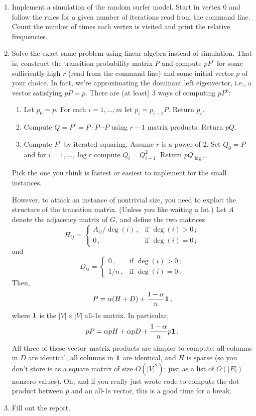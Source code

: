 \documentclass{tufte-handout}
\begin{document}
\begin{enumerate}
\item Implement a simulation of the random surfer model. 
  Start in
  vertex 0 and follow the rules for a given number of iterations read
  from the command line. Count the number of times each vertex is
  visited and print the relative frequencies.
\item Solve the exact same problem using linear algebra instead of
  simulation.
  That is, construct the transition probability matrix $P$ and
  compute $pP^r$ for some sufficiently high $r$ (read from the command
  line) and some initial vector $p$ of your choice.
  In fact, we're approximating the dominant left eigenvector, i.e., a
  vector satisfying $pP= p$.
  There are (at least) 3 ways of computing $pP^r$:
  \begin{enumerate} 
  \item Let $p_0= p$. For each $i=1,\ldots, m$ let $p_i = p_{i-1}
    P$. Return $p_r$.
  \item Compute $Q = P^r = P\cdot P \cdots P$ using $r-1$ matrix products.
    Return $pQ$.
  \item Compute $P^r$ by iterated squaring. Assume $r$ is a power of
    2. Set $Q_0 = P$ and for $i=1,\ldots,\log r$ compute $Q_i =
    Q_{i-1}^2$. Return $pQ_{\log r}$. 
  \end{enumerate}
  Pick the one you think is fastest or easiest to implement for the
  small instances.

  However, to attack an instance of nontrivial size, you need to
  exploit the structure of the transition matrix.
  (Unless you like waiting a lot.)
  Let $A$ denote the adjacency matrix of $G$, and define the two
  matrices
  \[
  H_{ij} =
  \begin{cases}
    A_{ij} / \deg(i)\,, & \text{if } \deg(i) > 0\,; \\
    0\,, & \text{if } \deg(i) = 0 \,;   
  \end{cases}
  \]
  and
  \[
  D_{ij} =
  \begin{cases}
    0\,, & \text{if } \deg(i) > 0\,; \\
    1 / n\,, & \text{if } \deg(i) = 0\,.
  \end{cases}
  \]
  Then,
  \[ P = \alpha(H + D) + \frac{1-\alpha}{n} \bf 1\,,\]
  where $\bf 1$ is the $|V|\times |V|$ all-1s matrix.
  In particular,
  \[pP = \alpha p H + \alpha p D + \frac{1-\alpha}{n} p \bf 1\,.\] All
  three of these vector--matrix products are simpler to compute: all
  columns in $D$ are identical, all columns in $\bf 1$ are identical,
  and $H$ is sparse (so you don't store is as a square matrix of size
  $O(|V|^2)$; just as a list of $O(|E|)$ nonzero values).
  Oh, and if you really just wrote code to compute the dot product
  between $p$ and an all-1s vector, this is a good time for a break.
\item Fill out the report.
\end{enumerate}
\end{document}
